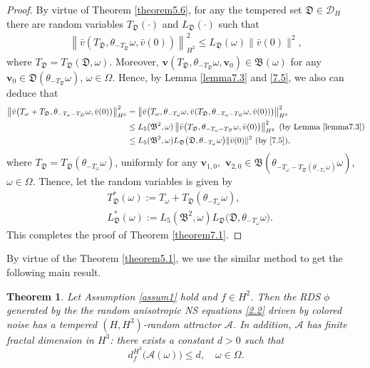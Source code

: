 \documentclass{elsarticle}
\newtheorem{theorem}{Theorem}[section]
\theoremstyle{definition}
\numberwithin{equation}{section}
\newcommand{\D}{\mathcal{D}}
\newcommand{\A}{\mathcal{A}}
\newcommand{\B}{\mathfrak{B}}
\begin{document}
\begin{proof}
By virtue of Theorem \ref{theorem5.6}, for any the tempered set   $\mathfrak D\in \D_H$ there are random variables $ T_{\mathfrak D}(\cdot )  $ and $L_{\mathfrak D}(\cdot) $ such that
  \begin{align} \label{7.5}
  \left \| \bar v\left (T_{\mathfrak D} ,\theta_{-T_{\mathfrak D}}\omega,  \bar v(0)\right)
  \right \|^2_{H^2}
 \leq L_{\mathfrak D}( \omega) \|\bar {v} (0)\|^2  ,
  \end{align}
where $T_{\mathfrak D}= T_{\mathfrak D}(\mathfrak D, \omega)$. Moreover, $ \textbf{v}\left (T_{\mathfrak D} ,\theta_{-T_{\mathfrak D}}\omega,  \textbf{v}_{0}\right) \in \mathfrak B(\omega)$ for any $\textbf{v}_0\in \mathfrak D(\theta_{-T_{\mathfrak D}}\omega) $, $\omega\in \Omega$.
Hence, by Lemma \ref{lemma7.3} and \eqref{7.5}, we also can deduce that
 \begin{align*}
  \left \| \bar v \big( T_\omega +T_{\mathfrak D}, \theta_{-T_\omega-T_{\mathfrak D}}
 \omega, \bar v(0) \big)
   \right \|^2_{H^3}
 &  =  \left \| \bar v \big( T_\omega  , \theta_{-T_\omega }
 \omega, \bar v  ( T_{\mathfrak D}, \theta_{-T_\omega-T_{\mathfrak D}}
 \omega, \bar v(0)  )\big)
   \right \|^2_{H^3}  \\
   &\leq  L_5(\mathfrak B^2, \omega) \left \|  \bar v \big  ( T_{\mathfrak D}, \theta_{-T_\omega-T_{\mathfrak D}}
 \omega, \bar v(0)  \big)
   \right \|^2_{H^2}  \  \text{(by Lemma \ref{lemma7.3})}\\
   &\leq L_5(\mathfrak B^2,\omega)  L_{\mathfrak D} \big (\mathfrak D, \theta_{-T_\omega}\omega \big) \|\bar v(0)\|^2  \  \text{(by \eqref{7.5})} ,
 \end{align*}
where $T_{\mathfrak D}=T_{\mathfrak D}(\theta_{-T_\omega}  \omega)$,
uniformly for any $\textbf{v}_{1,0},$ $ \textbf{v}_{2,0}\in \B(\theta_{-T_\omega-T_{\mathfrak D}(\theta_{-T_\omega} \omega)}\omega)$, $  \omega\in \Omega$. Thence,
let  the random variables is given by
 \begin{align*}
  & T_{\mathfrak D}^*( \omega) := T_\omega +T_{\mathfrak D}(\theta_{-T_\omega} \omega) , \\
  &L_{\mathfrak D}^*(\omega) :=  L_5(\mathfrak B^2,\omega)   L_{\mathfrak D} \big (\mathfrak D, \theta_{-T_\omega}\omega \big).
 \end{align*}
This completes the proof of Theorem \ref{theorem7.1}.
  \end{proof}
By virtue of the Theorem \ref{theorem5.1}, we use the similar method to get the following main result.
\begin{theorem} \label{theorem7.2}
 Let Assumption \ref{assum1} hold and $f\in H^2$. Then the  RDS $\phi$ generated by the the random anisotropic  NS equations \eqref{2.2} driven by colored noise  has  a tempered $(H,H^3)$-random attractor $\mathcal A $. In addition, $\mathcal A$ has finite fractal dimension in $H^3$: there exists   a constant $ d>0$ such that
\[
d_f^{H^3} \! \big ( \A(\omega) \big)  \leq d, \quad \omega \in \Omega.
\]
\end{theorem}
\end{document}

